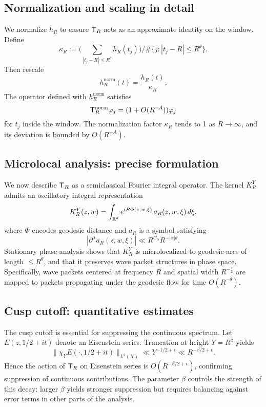 \subsection{Normalization and scaling in detail}\label{subsec:proj-normalize-detail}

We normalize $h_R$ to ensure $\mathsf{T}_R$ acts as an approximate identity on the window. Define
\[
\kappa_R := \Big(\sum_{|t_j-R|\le R^\theta} h_R(t_j)\Big) \Big/ \#\{j:|t_j-R|\le R^\theta\}.
\]
Then rescale
\[
h_R^{\mathrm{norm}}(t) = \frac{h_R(t)}{\kappa_R}.
\]
The operator defined with $h_R^{\mathrm{norm}}$ satisfies
\[
\mathsf{T}_R^{\mathrm{norm}} \varphi_j = (1+O(R^{-\!A}))\varphi_j
\]
for $t_j$ inside the window. The normalization factor $\kappa_R$ tends to 1 as $R\to\infty$, and its deviation is bounded by $O(R^{-\!A})$.

\subsection{Microlocal analysis: precise formulation}\label{subsec:proj-microlocal-proof}

We now describe $\mathsf{T}_R$ as a semiclassical Fourier integral operator. The kernel $K_R^Y$ admits an oscillatory integral representation
\[
K_R^Y(z,w) = \int_{\mathbb{R}^d} e^{iR\Phi(z,w,\xi)}\,a_R(z,w,\xi)\,d\xi,
\]
where $\Phi$ encodes geodesic distance and $a_R$ is a symbol satisfying
\[
|\partial^\alpha a_R(z,w,\xi)| \ll R^{C_\alpha}R^{-|\alpha|\theta}.
\]
Stationary phase analysis shows that $K_R^Y$ is microlocalized to geodesic arcs of length $\le R^\theta$, and that it preserves wave packet structures in phase space. Specifically, wave packets centered at frequency $R$ and spatial width $R^{-\tfrac12}$ are mapped to packets propagating under the geodesic flow for time $O(R^{-\theta})$.

\subsection{Cusp cutoff: quantitative estimates}\label{subsec:proj-cusp-detail}

The cusp cutoff is essential for suppressing the continuous spectrum. Let $E(z,1/2+it)$ denote an Eisenstein series. Truncation at height $Y=R^\beta$ yields
\[
\|\chi_Y E(\cdot,1/2+it)\|_{L^2(X)} \ll Y^{-1/2+\epsilon} \ll R^{-\beta/2+\epsilon}.
\]
Hence the action of $\mathsf{T}_R$ on Eisenstein series is $O(R^{-\beta/2+\epsilon})$, confirming suppression of continuous contributions. The parameter $\beta$ controls the strength of this decay: larger $\beta$ yields stronger suppression but requires balancing against error terms in other parts of the analysis.

